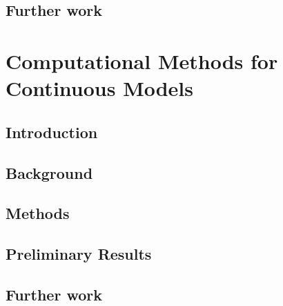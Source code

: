 \documentclass{report}
\begin{document}
\section{Further work}



\chapter{Computational Methods for Continuous Models}

%

\section{Introduction}
\label{sec:intro_ct}

%
\section{Background}
\label{sec:background_ct}

%
\section{Methods}
\label{sec:methods_ct}


\section{Preliminary Results}
\label{sec:results_ct}

%
%
%
\section{Further work}
\label{sec:futher_ct}

%
%
\end{document}
